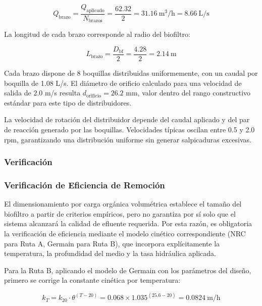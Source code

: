 \documentclass[12pt,a4paper]{article}
\begin{document}
\begin{equation}
Q_{\text{brazo}} = \frac{Q_{\text{aplicado}}}{N_{\text{brazos}}} = \frac{62.32}{2} = 31.16\ \text{m}^3\text{/h} = 8.66\ \text{L/s}
\end{equation}

La longitud de cada brazo corresponde al radio del biofiltro:

\begin{equation}
L_{\text{brazo}} = \frac{D_{\text{bf}}}{2} = \frac{4.28}{2} = 2.14\ \text{m}
\end{equation}

Cada brazo dispone de 8 boquillas distribuidas uniformemente, con un caudal por boquilla de 1.08 L/s. El diámetro de orificio calculado para una velocidad de salida de 2.0 m/s resulta $d_{\text{orificio}} = 26.2$ mm, valor dentro del rango constructivo estándar para este tipo de distribuidores.

La velocidad de rotación del distribuidor depende del caudal aplicado y del par de reacción generado por las boquillas. Velocidades típicas oscilan entre 0.5 y 2.0 rpm, garantizando una distribución uniforme sin generar salpicaduras excesivas.

\subsubsection{Verificación}

\subsubsection*{Verificación de Eficiencia de Remoción}

El dimensionamiento por carga orgánica volumétrica establece el tamaño del biofiltro a partir de criterios empíricos, pero no garantiza por sí solo que el sistema alcanzará la calidad de efluente requerida. Por esta razón, es obligatoria la verificación de eficiencia mediante el modelo cinético correspondiente (NRC para Ruta A, Germain para Ruta B), que incorpora explícitamente la temperatura, la profundidad del medio y la tasa hidráulica aplicada.

Para la Ruta B, aplicando el modelo de Germain con los parámetros del diseño, primero se corrige la constante cinética por temperatura:

\begin{equation}
k_T = k_{20} \cdot \theta^{(T-20)} = 0.068 \times 1.035^{(25.6-20)} = 0.0824\ \text{m/h}
\end{equation}
\end{document}
